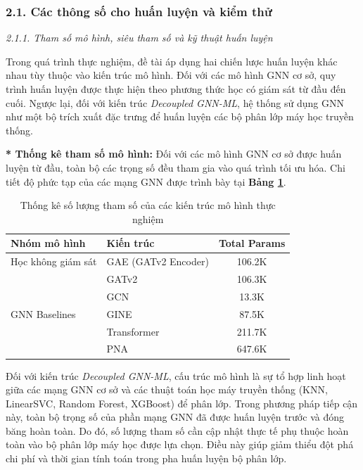 \subsubsection{2.1. Các thông số cho huấn luyện và kiểm thử}

\textit{2.1.1. Tham số mô hình, siêu tham số và kỹ thuật huấn luyện}\vspace{0.2cm}

\indent Trong quá trình thực nghiệm, đề tài áp dụng hai chiến lược huấn luyện khác nhau tùy thuộc vào kiến trúc mô hình. Đối với các mô hình GNN cơ sở, quy trình huấn luyện được thực hiện theo phương thức học có giám sát từ đầu đến cuối. Ngược lại, đối với kiến trúc \textit{Decoupled GNN-ML}, hệ thống sử dụng GNN như một bộ trích xuất đặc trưng để huấn luyện các bộ phân lớp máy học truyền thống.\vspace{0.3cm}

\textbf{* Thống kê tham số mô hình:}
Đối với các mô hình GNN cơ sở được huấn luyện từ đầu, toàn bộ các trọng số đều tham gia vào quá trình tối ưu hóa. Chi tiết độ phức tạp của các mạng GNN được trình bày tại \textbf{Bảng \ref{tab:ModelParamsComp}}.

\begin{table}[H]
    \centering
    \caption{Thống kê số lượng tham số của các kiến trúc mô hình thực nghiệm}
    \label{tab:ModelParamsComp}
    \renewcommand{\arraystretch}{1.2}
    \setlength{\tabcolsep}{15pt}
    \begin{tabular}{llc}
        \hline
        \textbf{Nhóm mô hình} & \textbf{Kiến trúc} & \textbf{Total Params} \\
        \hline
        Học không giám sát & GAE (GATv2 Encoder) & 106.2K \\
        \hline
        \multirow{5}{*}{GNN Baselines} 
        & GATv2 & 106.3K \\
        & GCN & 13.3K \\
        & GINE & 87.5K \\
        & Transformer & 211.7K \\
        & PNA & 647.6K \\
        \hline
    \end{tabular}
\end{table}

Đối với kiến trúc \textit{Decoupled GNN-ML}, cấu trúc mô hình là sự tổ hợp linh hoạt giữa các mạng GNN cơ sở và các thuật toán học máy truyền thống (KNN, LinearSVC, Random Forest, XGBoost) để phân lớp. Trong phương pháp tiếp cận này, toàn bộ trọng số của phần mạng GNN đã được huấn luyện trước và đóng băng hoàn toàn. Do đó, số lượng tham số cần cập nhật thực tế phụ thuộc hoàn toàn vào bộ phân lớp máy học được lựa chọn. Điều này giúp giảm thiểu đột phá chi phí và thời gian tính toán trong pha huấn luyện bộ phân lớp.\vspace{0.3cm}

